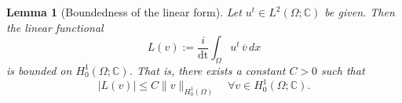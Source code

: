 \documentclass{article}
\theoremstyle{definition}
\theoremstyle{plain}
\newtheorem{lemma}[definition]{Lemma}
\theoremstyle{remark}
\newcommand{\dt}{\text{dt}}
\begin{document}




\begin{lemma}[Boundedness of the linear form]
Let $u^t \in L^2(\Omega; \mathbb{C})$ be given. Then the linear functional
\[
L(v) := \frac{i}{\dt}\int_\Omega  u^{t} \, \overline{v} \, dx
\]
is bounded on $H_0^1(\Omega; \mathbb{C})$. That is, there exists a constant $C > 0$ such that
\[
|L(v)| \leq C \|v\|_{H_0^1(\Omega)} \quad \forall v \in H_0^1(\Omega; \mathbb{C}).
\]
\end{lemma}
\end{document}

